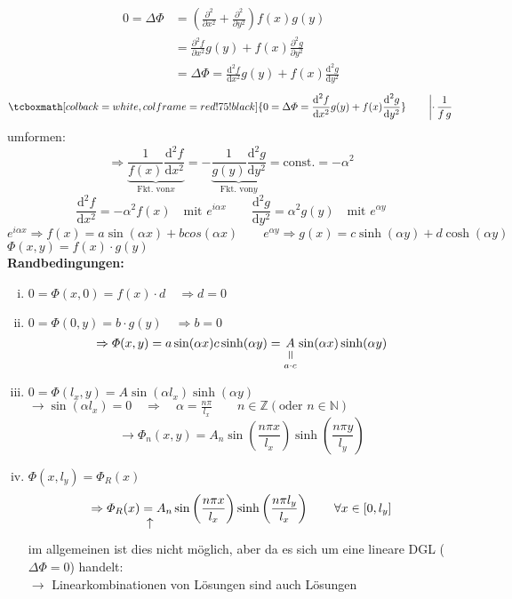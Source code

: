 \documentclass[titlepage,11pt,a4paper,ngerman]{report}
\newcommand{\tx}[1]{\textrm{#1}}
\newcommand{\const}{\tx{const.}}
\newcommand{\ub}[1]{\underbrace{#1}}
\newcommand{\verteq}{\rotatebox{90}{$\,=$}}
\newcommand{\equalto}[2]{\underset{\scriptstyle\overset{\mkern4mu\verteq}{#2}}{#1}}
\newcommand{\custo}[3]{\underset{\scriptstyle\overset{\mkern4mu\rotatebox{-90}{$\,#1$}}{#3}}{#2}}
\newcommand{\prt}[2]{\frac{\partial #1}{\partial #2}}
\newcommand{\prd}[2]{\frac{\tx{d} #1}{\tx{d} #2}}
\renewcommand{\Phi}{\varPhi}
\newcommand{\rmbox}[1]{\tcboxmath[colback=white,colframe=red!75!black]{#1}}
\begin{document}
\begin{align*}
0 = \Delta \Phi &= \left(\prt{^2}{x^2} + \prt{^2}{y^2}\right) f(x) g(y)\\
&= \prt{^2 f}{x^2} g(y) + f(x) \prt{^2 g}{y^2}\\
&= \Delta \Phi = \prd{^2 f}{x^2} g(y) + f(x) \prd{^2 g}{y^2}
\end{align*}
\begin{equation*}
\rmbox{0 = \Delta \Phi = \prd{^2 f}{x^2} g(y) + f(x) \prd{^2 g}{y^2} } \qquad \left\rvert \cdot \, \frac{1}{f\,g} \right.
\end{equation*}
umformen:
\begin{equation*}
\Rightarrow \ub{\frac{1}{f(x)} \prd{^2 f}{x^2}}_{\tx{Fkt. von} x} = - \ub{\frac{1}{g(y)} \prd{^2 g}{y^2}}_{\tx{Fkt. von} y} = \const = - \alpha ^2
\end{equation*}
\begin{equation*}
\prd{^2 f}{x^2} = - \alpha^2 f(x) \quad \tx{mit } e^{i\alpha x} \qquad \prd{^2 g}{y^2} = \alpha^2 g(y) \quad \tx{mit } e^{\alpha y}
\end{equation*}
\begin{equation*}
e^{i \alpha x} \Rightarrow f(x) = a \sin(\alpha x) + b cos(\alpha x) \qquad e^{\alpha y} \Rightarrow g(x) = c \sinh(\alpha y) + d \cosh(\alpha y)
\end{equation*}
$ \Phi(x,y) = f(x) \cdot g(y) $\\[5pt]
\textbf{Randbedingungen:}
\begin{enumerate}[i)]
	\item $ 0 = \Phi(x,0) = f(x) \cdot d \quad \Rightarrow d = 0 $
	\item $ 0 = \Phi(0,y) = b \cdot g(y) \quad \Rightarrow b = 0 $
	\begin{equation*}
	\Rightarrow \Phi(x,y) = a \sin(\alpha x) c \sinh(\alpha y) = \equalto{A}{a\cdot c} \sin(\alpha x) \sinh(\alpha y)
	\end{equation*}
	\item $ 0 = \Phi(l_x,y) = A \sin(\alpha l_x) \sinh(\alpha y) $
	$ \rightarrow \sin(\alpha l_x) = 0 \quad \Rightarrow \quad \alpha = \frac{n \pi}{l_x} \qquad n \in \mathbb{Z} (\tx{oder } n \in \mathbb{N}) $
	\begin{equation*}
	\rightarrow \Phi_n(x,y) = A_n \sin\left(\frac{n \pi x}{l_x}\right) \sinh\left(\frac{n \pi y}{l_y}\right)
	\end{equation*}
	\item $ \Phi(x,l_y) = \Phi_R(x) $
	\begin{equation*}
	\Rightarrow \Phi_R(x) \custo{\leftarrow}{=}{} A_n \sin\left(\frac{n \pi x}{l_x}\right) \sinh\left(\frac{n \pi l_y}{l_x}\right) \qquad \forall x \in [0,l_y]
	\end{equation*}
	im allgemeinen ist dies nicht möglich, aber da es sich um eine lineare DGL ($ \Delta \Phi = 0 $) handelt:\\
	$ \rightarrow $ Linearkombinationen von Lösungen sind auch Lösungen
\end{enumerate}
\end{document}
